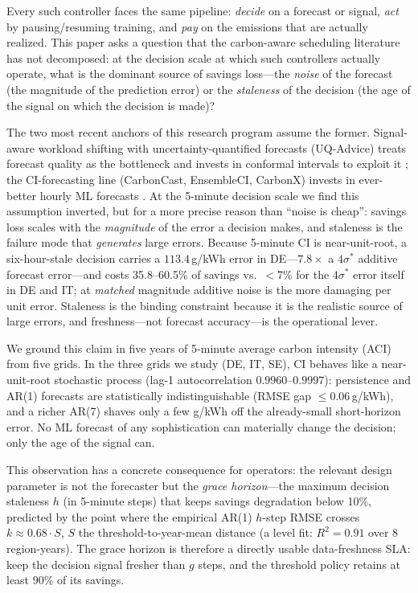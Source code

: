 \documentclass[sigconf,nonacm=false]{acmart}
\begin{document}
Every such controller faces the same pipeline: \emph{decide} on a forecast or
signal, \emph{act} by pausing/resuming training, and \emph{pay} on the emissions
that are actually realized. This paper asks a question that the carbon-aware
scheduling literature has not decomposed: at the decision scale at which such
controllers actually operate, what is the dominant source of savings loss---the
\emph{noise} of the forecast (the magnitude of the prediction error) or the
\emph{staleness} of the decision (the age of the signal on which the decision is
made)?

The two most recent anchors of this research program assume the former.
Signal-aware workload shifting with uncertainty-quantified forecasts (UQ-Advice)
treats forecast quality as the bottleneck and invests in conformal intervals to
exploit it \cite{johnson2025uqadvice}; the CI-forecasting line (CarbonCast,
EnsembleCI, CarbonX) invests in ever-better hourly ML forecasts
\cite{maji2023carboncast,yan2025ensembleci,maji2025carbonx}. At the 5-minute
decision scale we find this assumption inverted, but for a more precise reason
than ``noise is cheap'': savings loss scales with the \emph{magnitude} of the
error a decision makes, and staleness is the failure mode that \emph{generates}
large errors. Because 5-minute CI is near-unit-root, a six-hour-stale decision
carries a $113.4$\,g/kWh error in DE---$7.8\times$ a $4\sigma^*$ additive
forecast error---and costs 35.8--60.5\% of savings vs.\ $<$7\% for the
$4\sigma^*$ error itself in DE and IT; at \emph{matched} magnitude additive noise is the
more damaging per unit error. Staleness is the binding constraint because it is
the realistic source of large errors, and freshness---not forecast accuracy---is
the operational lever.

We ground this claim in five years of 5-minute average carbon intensity (ACI)
from five grids. In the three grids we study (DE, IT, SE), CI behaves like a
near-unit-root stochastic process (lag-1 autocorrelation $0.9960$--$0.9997$):
persistence and AR(1)
forecasts are statistically indistinguishable (RMSE gap $\le 0.06$\,g/kWh), and
a richer AR(7) shaves only a few g/kWh off the already-small short-horizon error.
No ML forecast of any sophistication can materially change the decision; only the
age of the signal can.

This observation has a concrete consequence for operators: the relevant design
parameter is not the forecaster but the \emph{grace horizon}---the maximum
decision staleness $h$ (in 5-minute steps) that keeps savings degradation below
10\%, predicted by the point where the empirical AR(1) $h$-step RMSE crosses
$k\approx0.68\cdot S$, $S$ the threshold-to-year-mean distance (a level fit:
$R^2{=}0.91$ over 8 region-years). The grace horizon is therefore a directly
usable data-freshness SLA: keep the decision signal fresher than $g$ steps, and
the threshold policy retains at least 90\% of its savings.
\end{document}
